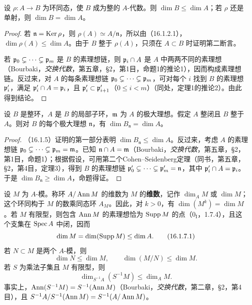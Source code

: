设 $\rho:A\to B$ 为环同态，使 $B$ 成为整的 $A$-代数。则 $\dim B\leq\dim A$；若 $\rho$ 还是单射，则 $\dim B=\dim A$。
\begin{proof}
若 $\mathfrak n=\operatorname{Ker}\rho$，则 $\rho(A)\simeq A/\mathfrak n$，所以由（16.1.2.1），$\dim\rho(A)\leq\dim A$。由于 $B$ 整于 $\rho(A)$，只须在 $A\subset B$ 时证明第二断言。

若 $\mathfrak p_0\subsetneq\cdots\subsetneq\mathfrak p_m$ 是 $B$ 的素理想链，则 $\mathfrak p_i\cap A$ 是 $A$ 中两两不同的素理想（Bourbaki，\textit{交换代数}，第五章，§2，第1目，命题1的推论1），因而构成素理想链。反过来，对 $A$ 的每条素理想链 $\mathfrak p_0\subsetneq\cdots\subsetneq\mathfrak p_m$，可对每个 $i$ 找到 $B$ 的素理想 $\mathfrak p'_i$，满足 $\mathfrak p'_i\cap A=\mathfrak p_i$，且 $\mathfrak p'_i\subset\mathfrak p'_{i+1}$（$0\leq i<m$）（同处，定理1的推论2）。由此得到结论。
\end{proof}

设 $B$ 是整环，$A$ 是 $B$ 的局部子环，$\mathfrak m$ 为 $A$ 的极大理想。假定 $A$ 整闭且 $B$ 整于 $A$。则对 $B$ 的每个极大理想 $\mathfrak n$，有 $\dim B_{\mathfrak n}=\dim A$。
\begin{proof}
（16.1.5）证明的第一部分表明 $\dim B_{\mathfrak n}\leq\dim A$。反过来，考虑 $A$ 的素理想链 $\mathfrak p_0\subsetneq\cdots\subsetneq\mathfrak p_m=\mathfrak m$。已知 $\mathfrak n\cap A=\mathfrak m$（Bourbaki，\textit{交换代数}，第五章，§2，第1目，命题1）；根据假设，可用第二个Cohen--Seidenberg定理（同书，第五章，§2，第4目，定理3），得到 $B$ 的素理想链
$\mathfrak p'_0\subsetneq\cdots\subsetneq\mathfrak p'_m=\mathfrak n$，其中 $\mathfrak p'_i\cap A=\mathfrak p_i$。于是 $\dim B_{\mathfrak n}\geq\dim A$，命题得证。
\end{proof}

设 $M$ 为 $A$-模。称环 $A/\operatorname{Ann} M$ 的维数为 $M$ 的\textbf{维数}，记作 $\dim_A M$ 或 $\dim M$；这个环同构于 $M$ 的数乘同态环 $A_M$。因此，对 $k>0$，有 $\dim(M^k)=\dim M$。若 $M$ 有限型，则包含 $\operatorname{Ann} M$ 的素理想恰为 $\operatorname{Supp} M$ 的点（$0_{\mathrm I}$，1.7.4），且这个支集在 $\operatorname{Spec} A$ 中闭，因而
\begin{equation}
 \dim M=\dim(\operatorname{Supp} M)\leq\dim A.
 \tag{16.1.7.1}
\end{equation}
若 $N\subset M$ 是两个 $A$-模，则
\begin{equation}
 \dim N\leq\dim M,\qquad \dim(M/N)\leq\dim M.
 \tag{16.1.7.2}
\end{equation}
若 $S$ 为乘法子集且 $M$ 有限型，则
\begin{equation}
 \dim_{S^{-1}A}(S^{-1}M)\leq\dim_A M.
 \tag{16.1.7.3}
\end{equation}
事实上，$\operatorname{Ann}(S^{-1}M)=S^{-1}(\operatorname{Ann} M)$（Bourbaki，\textit{交换代数}，第二章，§2，第4目），且
$S^{-1}A/S^{-1}(\operatorname{Ann} M)=S^{-1}(A/\operatorname{Ann} M)$。

